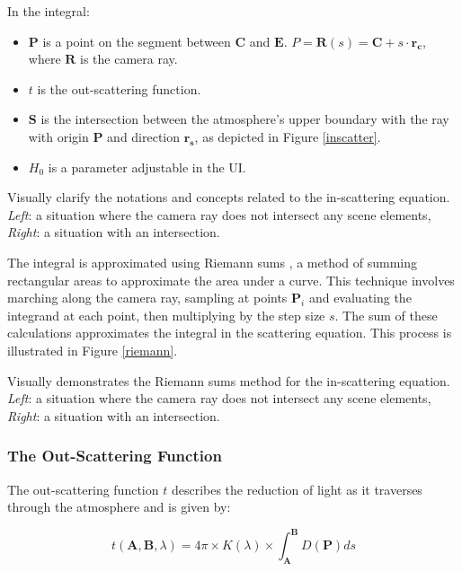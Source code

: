 In the integral:
\begin{itemize}
    \item $\mathbf{P}$ is a point on the segment between $\mathbf{C}$ and $\mathbf{E}$. $P = \mathbf{R}(s) = \mathbf{C} + s \cdot \mathbf{r_c}$, where $\mathbf{R}$ is the camera ray.
    \item $t$ is the out-scattering function.
    \item $\mathbf{S}$ is the intersection between the atmosphere's upper boundary with the ray with origin $\mathbf{P}$ and direction $\mathbf{r_s}$, as depicted in Figure \ref{inscatter}.
    \item $H_0$ is a parameter adjustable in the UI.
\end{itemize}

{Visually clarify the notations and concepts related to the in-scattering equation. \textit{Left}: a situation where the camera ray does not intersect any scene elements, \textit{Right}: a situation with an intersection.}

\vspace{0.5em}
The integral is approximated using Riemann sums \cite{hugheshallett_applied_2009}, a method of summing rectangular areas to approximate the area under a curve. This technique involves marching along the camera ray, sampling at points $\mathbf{P}_i$ and evaluating the integrand at each point, then multiplying by the step size $s$. The sum of these calculations approximates the integral in the scattering equation. This process is illustrated in Figure \ref{riemann}.

{Visually demonstrates the Riemann sums method for the in-scattering equation. \textit{Left}: a situation where the camera ray does not intersect any scene elements, \textit{Right}: a situation with an intersection.}

\subsubsection{The Out-Scattering Function}

The out-scattering function $t$ describes the reduction of light as it traverses through the atmosphere and is given by:

\begin{equation}
    t(\mathbf{A}, \mathbf{B}, \lambda) = 4\pi \times K(\lambda) \times \int_{\mathbf{A}}^{\mathbf{B}} D(\mathbf{P}) ds
\end{equation}

